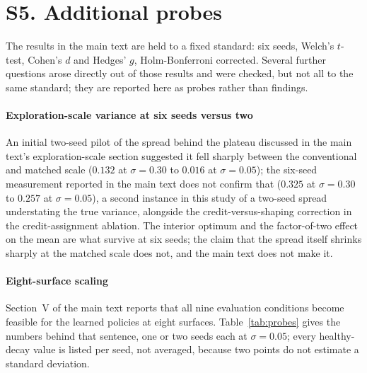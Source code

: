 \documentclass[11pt]{article}
\begin{document}
\section*{S5. Additional probes}
\label{sec:s5}

The results in the main text are held to a fixed standard: six seeds,
Welch's $t$-test, Cohen's $d$ and Hedges' $g$, Holm-Bonferroni corrected.
Several further questions arose directly out of those results and were
checked, but not all to the same standard; they are reported here as
probes rather than findings.

\paragraph{Exploration-scale variance at six seeds versus two}
An initial two-seed pilot of the spread behind the plateau discussed in
the main text's exploration-scale section suggested it fell sharply
between the conventional and matched scale ($0.132$ at $\sigma=0.30$ to
$0.016$ at $\sigma=0.05$); the six-seed measurement reported in the main
text does not confirm that ($0.325$ at $\sigma=0.30$ to $0.257$ at
$\sigma=0.05$), a second instance in this study of a two-seed spread
understating the true variance, alongside the credit-versus-shaping
correction in the credit-assignment ablation. The interior optimum and the
factor-of-two effect on the mean are what survive at six seeds; the claim
that the spread itself shrinks sharply at the matched scale does not, and
the main text does not make it.

\paragraph{Eight-surface scaling}
Section~V of the main text reports that all nine evaluation conditions
become feasible for the learned policies at eight surfaces. Table~\ref{tab:probes}
gives the numbers behind that sentence, one or two seeds each at
$\sigma=0.05$; every healthy-decay value is listed per seed, not averaged,
because two points do not estimate a standard deviation.
\end{document}
